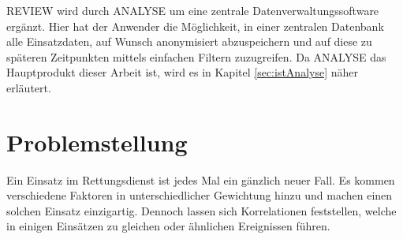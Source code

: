 \gls{REVIEW} wird durch \gls{ANALYSE} um eine zentrale Datenverwaltungssoftware ergänzt.
Hier hat der Anwender die Möglichkeit, in einer zentralen Datenbank alle Einsatzdaten, auf Wunsch anonymisiert abzuspeichern und auf diese zu späteren Zeitpunkten mittels einfachen Filtern zuzugreifen.
Da \gls{ANALYSE} das Hauptprodukt dieser Arbeit ist, wird es in Kapitel \ref{sec:istAnalyse} näher erläutert.





%

\section{Problemstellung}
\label{problem}
Ein Einsatz im Rettungsdienst ist jedes Mal ein gänzlich neuer Fall. 
Es kommen verschiedene Faktoren in unterschiedlicher Gewichtung hinzu und machen einen solchen Einsatz einzigartig. 
Dennoch lassen sich Korrelationen feststellen, welche in einigen Einsätzen zu gleichen oder ähnlichen Ereignissen führen.


